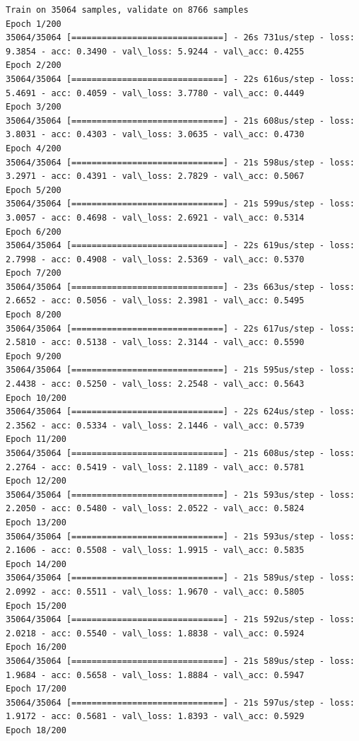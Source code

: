 \documentclass[11pt]{article}
\begin{document}
    \begin{Verbatim}[commandchars=\\\{\}]
Train on 35064 samples, validate on 8766 samples
Epoch 1/200
35064/35064 [==============================] - 26s 731us/step - loss: 9.3854 - acc: 0.3490 - val\_loss: 5.9244 - val\_acc: 0.4255
Epoch 2/200
35064/35064 [==============================] - 22s 616us/step - loss: 5.4691 - acc: 0.4059 - val\_loss: 3.7780 - val\_acc: 0.4449
Epoch 3/200
35064/35064 [==============================] - 21s 608us/step - loss: 3.8031 - acc: 0.4303 - val\_loss: 3.0635 - val\_acc: 0.4730
Epoch 4/200
35064/35064 [==============================] - 21s 598us/step - loss: 3.2971 - acc: 0.4391 - val\_loss: 2.7829 - val\_acc: 0.5067
Epoch 5/200
35064/35064 [==============================] - 21s 599us/step - loss: 3.0057 - acc: 0.4698 - val\_loss: 2.6921 - val\_acc: 0.5314
Epoch 6/200
35064/35064 [==============================] - 22s 619us/step - loss: 2.7998 - acc: 0.4908 - val\_loss: 2.5369 - val\_acc: 0.5370
Epoch 7/200
35064/35064 [==============================] - 23s 663us/step - loss: 2.6652 - acc: 0.5056 - val\_loss: 2.3981 - val\_acc: 0.5495
Epoch 8/200
35064/35064 [==============================] - 22s 617us/step - loss: 2.5810 - acc: 0.5138 - val\_loss: 2.3144 - val\_acc: 0.5590
Epoch 9/200
35064/35064 [==============================] - 21s 595us/step - loss: 2.4438 - acc: 0.5250 - val\_loss: 2.2548 - val\_acc: 0.5643
Epoch 10/200
35064/35064 [==============================] - 22s 624us/step - loss: 2.3562 - acc: 0.5334 - val\_loss: 2.1446 - val\_acc: 0.5739
Epoch 11/200
35064/35064 [==============================] - 21s 608us/step - loss: 2.2764 - acc: 0.5419 - val\_loss: 2.1189 - val\_acc: 0.5781
Epoch 12/200
35064/35064 [==============================] - 21s 593us/step - loss: 2.2050 - acc: 0.5480 - val\_loss: 2.0522 - val\_acc: 0.5824
Epoch 13/200
35064/35064 [==============================] - 21s 593us/step - loss: 2.1606 - acc: 0.5508 - val\_loss: 1.9915 - val\_acc: 0.5835
Epoch 14/200
35064/35064 [==============================] - 21s 589us/step - loss: 2.0992 - acc: 0.5511 - val\_loss: 1.9670 - val\_acc: 0.5805
Epoch 15/200
35064/35064 [==============================] - 21s 592us/step - loss: 2.0218 - acc: 0.5540 - val\_loss: 1.8838 - val\_acc: 0.5924
Epoch 16/200
35064/35064 [==============================] - 21s 589us/step - loss: 1.9684 - acc: 0.5658 - val\_loss: 1.8884 - val\_acc: 0.5947
Epoch 17/200
35064/35064 [==============================] - 21s 597us/step - loss: 1.9172 - acc: 0.5681 - val\_loss: 1.8393 - val\_acc: 0.5929
Epoch 18/200

\end{Verbatim}
\end{document}
